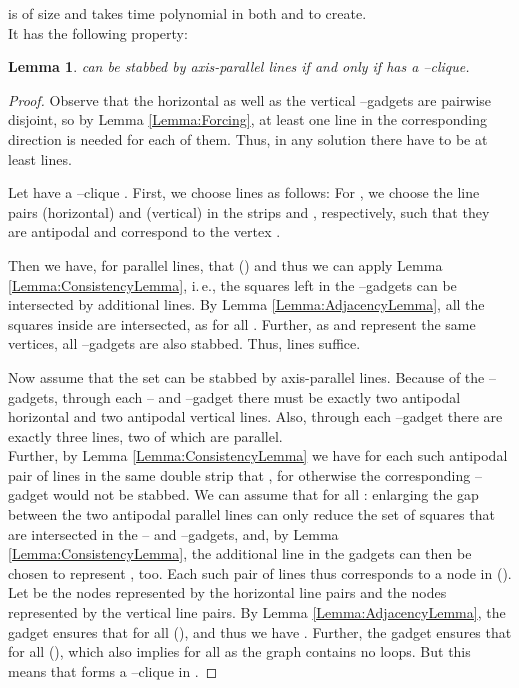 \documentclass[12pt]{article}
\newtheorem{lemma}[definition]{Lemma}
\begin{document}
is of size  and takes time polynomial in both  and  to create.
\\
It has the following property:
\begin{lemma}
  \label{lem:mainLemma}
   can be stabbed by  axis-parallel lines if and only if
   has a --clique.
\end{lemma}
\begin{proof}
	Observe that the horizontal as well as the vertical --gadgets are pairwise disjoint, so by Lemma \ref{Lemma:Forcing}, at least one line in the corresponding direction is needed for each of them.
  Thus, in any solution there have to be at least  lines.  

  Let  have a --clique . First, we choose  lines as follows: For , we	choose the line pairs  (horizontal) and  (vertical) in the strips  and , respectively, such that they are antipodal and correspond to the vertex .
  
  Then we have, for parallel lines, that
   () and thus we can apply Lemma
  \ref{Lemma:ConsistencyLemma}, i.\,e., the squares left in the  --gadgets can be
  intersected by  additional lines. By Lemma \ref{Lemma:AdjacencyLemma}, all the squares
  inside  are intersected, as  for all . Further, as  and  represent
  the same vertices, all --gadgets are also stabbed. 
  Thus,  lines suffice.

  Now assume that the set can be stabbed by  axis-parallel lines. Because of the
  --gadgets, through each -- and --gadget there must be exactly
  two antipodal horizontal and two antipodal vertical lines. Also, through each --gadget there are exactly three lines, two of which are parallel.\\ Further, by Lemma \ref{Lemma:ConsistencyLemma} we have for each such antipodal pair  of lines in the same double strip that , 
  for otherwise the corresponding --gadget would not be stabbed. We can
  assume that  for all : enlarging the gap between the two antipodal parallel 
  lines can only reduce the set of squares that are intersected in the -- and --gadgets, and, by Lemma \ref{Lemma:ConsistencyLemma}, the additional line in the  gadgets can then be chosen to represent , too. Each such pair of lines thus corresponds
  to a node in  (). Let  be the nodes
  represented by the horizontal line pairs and 
  the nodes represented by the vertical line pairs. By Lemma \ref{Lemma:AdjacencyLemma}, the gadget  ensures that  for all  (), and thus we have . Further, the gadget 
  ensures that  for all  (), which also
  implies  for all  as the graph contains no loops. But this means that  forms a --clique in .
  
\end{proof}
\end{document}
